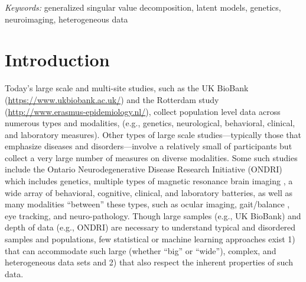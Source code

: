 \documentclass[12pt]{article}
\begin{document}
\noindent%
{\it Keywords:} generalized singular value decomposition, latent models, genetics, neuroimaging, heterogeneous data
\vfill

\newpage
{} %

\hypertarget{introduction}{%
\section{Introduction}\label{introduction}}

\label{section:Intro}

Today's large scale and multi-site studies, such as the UK BioBank
(\url{https://www.ukbiobank.ac.uk/}) and the Rotterdam study
(\url{http://www.erasmus-epidemiology.nl/}), collect population level
data across numerous types and modalities, (e.g., genetics,
neurological, behavioral, clinical, and laboratory measures). Other
types of large scale studies---typically those that emphasize diseases
and disorders---involve a relatively small of participants but collect a
very large number of measures on diverse modalities. Some such studies
include the Ontario Neurodegenerative Disease Research Initiative
(ONDRI) \citep{farhan_ontario_2016} which includes genetics, multiple
types of magnetic resonance brain imaging
\citep{duchesne_canadian_2019}, a wide array of behavioral, cognitive,
clinical, and laboratory batteries, as well as many modalities
``between'' these types, such as ocular imaging, gait/balance
\citep{montero-odasso_motor_2017-1}, eye tracking, and neuro-pathology.
Though large samples (e.g., UK BioBank) and depth of data (e.g., ONDRI)
are necessary to understand typical and disordered samples and
populations, few statistical or machine learning approaches exist 1)
that can accommodate such large (whether ``big'' or ``wide''), complex,
and heterogeneous data sets and 2) that also respect the inherent
properties of such data.
\end{document}
